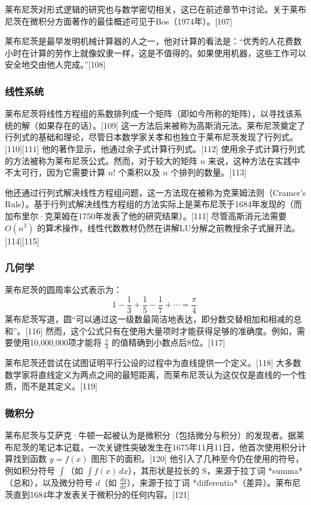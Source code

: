 莱布尼茨对形式逻辑的研究也与数学密切相关，这已在前述章节中讨论。关于莱布尼茨在微积分方面著作的最佳概述可见于Bos（1974年）。[107]

莱布尼茨是最早发明机械计算器的人之一，他对计算的看法是：“优秀的人花费数小时在计算的劳作上就像奴隶一样，这是不值得的。如果使用机器，这些工作可以安全地交由他人完成。”[108]
\subsubsection{线性系统}
莱布尼茨将线性方程组的系数排列成一个矩阵（即如今所称的矩阵），以寻找该系统的解（如果存在的话）。[109] 这一方法后来被称为高斯消元法。莱布尼茨奠定了行列式的基础和理论，尽管日本数学家关孝和也独立于莱布尼茨发现了行列式。[110][111] 他的著作显示，他通过余子式计算行列式。[112] 使用余子式计算行列式的方法被称为莱布尼茨公式。然而，对于较大的矩阵 \( n \) 来说，这种方法在实践中不太可行，因为它需要计算 \( n! \) 个乘积以及 \( n \) 个排列的数量。[113]  

他还通过行列式解决线性方程组问题，这一方法现在被称为克莱姆法则（Cramer's Rule）。基于行列式解决线性方程组的方法实际上是莱布尼茨于1684年发现的（而加布里尔·克莱姆在1750年发表了他的研究结果）。[111] 尽管高斯消元法需要 \( O(n^3) \) 的算术操作，线性代数教材仍然在讲解LU分解之前教授余子式展开法。[114][115]
\subsubsection{几何学}
莱布尼茨的圆周率公式表示为：
\[
1 - \frac{1}{3} + \frac{1}{5} - \frac{1}{7} + \cdots = \frac{\pi}{4}~
\]
莱布尼茨写道，圆“可以通过这一级数最简洁地表达，即分数交替相加和相减的总和”。[116] 然而，这个公式只有在使用大量项时才能获得足够的准确度。例如，需要使用10,000,000项才能将 \(\frac{\pi}{4}\) 的值精确到小数点后8位。[117]  

莱布尼茨还尝试在试图证明平行公设的过程中为直线提供一个定义。[118] 大多数数学家将直线定义为两点之间的最短距离，而莱布尼茨认为这仅仅是直线的一个性质，而不是其定义。[119]
\subsubsection{微积分}
莱布尼茨与艾萨克·牛顿一起被认为是微积分（包括微分与积分）的发现者。据莱布尼茨的笔记本记载，一次关键性突破发生在1675年11月11日，他首次使用积分计算找到函数 \( y = f(x) \) 图形下的面积。[120] 他引入了几种至今仍在使用的符号，例如积分符号 \( \int \)（如 \( \int f(x) \, dx \)），其形状是拉长的 S，来源于拉丁词 *summa*（总和），以及微分符号 \( d \)（如 \( \frac{dy}{dx} \)），来源于拉丁词 *differentia*（差异）。莱布尼茨直到1684年才发表关于微积分的任何内容。[121]  

